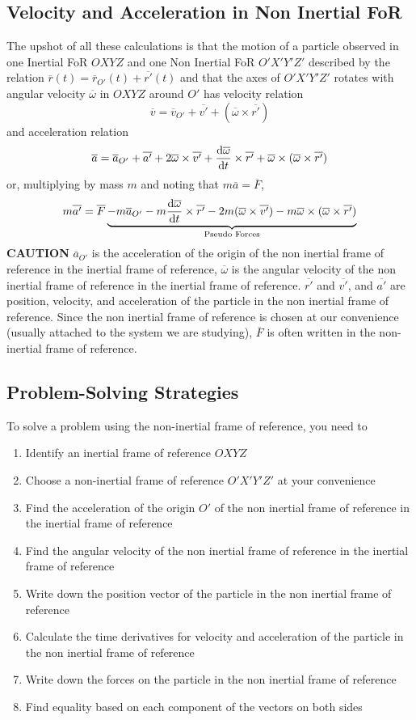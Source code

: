 \documentclass[a4paper,12pt,titlepage]{article}
\begin{document}
\subsection{Velocity and Acceleration in Non Inertial FoR}
The upshot of all these calculations is that the motion of a particle observed in one Inertial FoR $OXYZ$ and one Non Inertial FoR $O'X'Y'Z'$ described by the relation $\overline{r}(t)=\overline{r}_{O'} (t)+\overline{r'}(t)$ and that the axes of $O'X'Y'Z'$ rotates with angular velocity $\overline{\omega}$ in $OXYZ$ around $O'$ has velocity relation
\[\overline{v}=\overline{v}_{O'}+\overline{v'}+(\overline{\omega}\times\overline{r'})\]
and acceleration relation
\[\overline{a}=\overline{a}_{O'}+\overline{a'}+2\overline{\omega}\times\overline{v'}+\frac{\mathrm{d}\overline{\omega}}{\mathrm{d} t}\times\overline{r'}+\overline{\omega}\times(\overline{\omega}\times\overline{r'})\]
or, multiplying by mass $m$ and noting that $m\overline{a}=\overline{F}$,
\[
m\overline{a'}=\overline{F}\underbrace{-m\overline{a}_{O'}-m\frac{\mathrm{d}\overline{\omega}}{\mathrm{d} t}\times\overline{r'}-2m(\overline{\omega}\times\overline{v'})-m\overline{\omega}\times(\overline{\omega}\times\overline{r'})}_{\text{Pseudo Forces}}
\]
\textbf{CAUTION} $\overline{a}_{O'}$ is the acceleration of the origin of the non inertial frame of reference in the inertial frame of reference, $\overline\omega$ is the angular velocity of the non inertial frame of reference in the inertial frame of reference. $\overline{r'}$ and $\overline{v'}$, and $\overline{a'}$ are position, velocity, and acceleration of the particle in the non inertial frame of reference. Since the non inertial frame of reference is chosen at our convenience (usually attached to the system we are studying), $\overline{F}$ is often written in the non-inertial frame of reference.
\subsection{Problem-Solving Strategies}
To solve a problem using the non-inertial frame of reference, you need to
\begin{enumerate}
\item{Identify an inertial frame of reference $OXYZ$}
\item{Choose a non-inertial frame of reference $O'X'Y'Z'$ at your convenience}
\item{Find the acceleration of the origin $O'$ of the non inertial frame of reference in the inertial frame of reference}
\item{Find the angular velocity of the non inertial frame of reference in the inertial frame of reference}
\item{Write down the position vector of the particle in the non inertial frame of reference}
\item{Calculate the time derivatives for velocity and acceleration of the particle in the non inertial frame of reference}
\item{Write down the forces on the particle in the non inertial frame of reference}
\item{Find equality based on each component of the vectors on both sides}
\end{enumerate}
\end{document}
